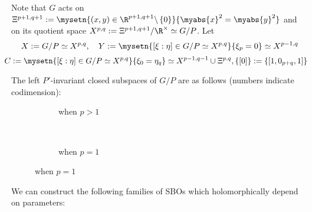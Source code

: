 \documentclass[pdf]{beamer}
\renewcommand{\setminus}{\backslash}
\theoremstyle{mystyle}
\theoremstyle{remark}
\begin{document}
\begin{frame}
Note that $G$ acts on $\Xi^{p+1,q+1}:=\mysetn{(x,y)\in\R^{p+1,q+1}\setminus\left\{ 0 \right\}}{\myabs{x}^2=\myabs{y}^2}$ and on its quotient space
$X^{p,q}:=\Xi^{p+1,q+1}/\R^{\times}\simeq G/P$. Let
\[
	X:=G/P\simeq X^{p,q},\quad Y:=\mysetn{[\xi:\eta]\in G/P\simeq X^{p,q}}{\xi_{p}=0}\simeq X^{p-1,q}\]
	\[\kern-0.32cm C:=\mysetn{[\xi:\eta]\in G/P\simeq X^{p,q}}{\xi_{0}=\eta_q}\simeq X^{p-1,q-1}\cup\Xi^{p,q},\left\{ [0] \right\}:=\left\{ [1,0_{p+q},1] \right\}\]
\begin{theorem}
	The left $P'$-invariant closed subspaces of $G/P$ are as follows (numbers indicate codimension):\\
	\vspace{-1em}
  \begin{figure}[H]
    \centering
    \begin{subfigure}[t]{0.3\textwidth}
	    \xymatrixrowsep{0.5pc}
	\caption{when $p>1$}
    \end{subfigure}
    ~ %
    \begin{subfigure}[t]{0.3\textwidth}
	    \xymatrixrowsep{0.5pc}
	    {}
	    \vspace{0.6em}
	\caption{when $p=1$}
    \end{subfigure}
\end{figure}
\end{theorem}
\end{frame}
\begin{frame}
	\begin{theorem}
		We can construct the following families of SBOs which holomorphically depend on parameters:
		\vspace{-0.9em}
		
	\end{theorem}
\end{frame}
\end{document}
